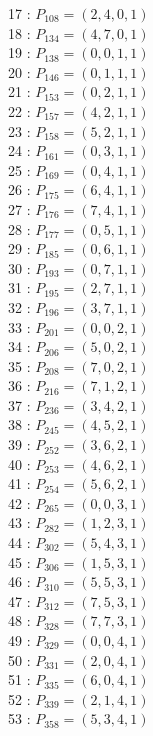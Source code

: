 \documentclass{article}
\begin{document}
{\begin{multicols}{3}
17 : $P_{108}=( 2, 4, 0, 1 )$\\
18 : $P_{134}=( 4, 7, 0, 1 )$\\
19 : $P_{138}=( 0, 0, 1, 1 )$\\
20 : $P_{146}=( 0, 1, 1, 1 )$\\
21 : $P_{153}=( 0, 2, 1, 1 )$\\
22 : $P_{157}=( 4, 2, 1, 1 )$\\
23 : $P_{158}=( 5, 2, 1, 1 )$\\
24 : $P_{161}=( 0, 3, 1, 1 )$\\
25 : $P_{169}=( 0, 4, 1, 1 )$\\
26 : $P_{175}=( 6, 4, 1, 1 )$\\
27 : $P_{176}=( 7, 4, 1, 1 )$\\
28 : $P_{177}=( 0, 5, 1, 1 )$\\
29 : $P_{185}=( 0, 6, 1, 1 )$\\
30 : $P_{193}=( 0, 7, 1, 1 )$\\
31 : $P_{195}=( 2, 7, 1, 1 )$\\
32 : $P_{196}=( 3, 7, 1, 1 )$\\
33 : $P_{201}=( 0, 0, 2, 1 )$\\
34 : $P_{206}=( 5, 0, 2, 1 )$\\
35 : $P_{208}=( 7, 0, 2, 1 )$\\
36 : $P_{216}=( 7, 1, 2, 1 )$\\
37 : $P_{236}=( 3, 4, 2, 1 )$\\
38 : $P_{245}=( 4, 5, 2, 1 )$\\
39 : $P_{252}=( 3, 6, 2, 1 )$\\
40 : $P_{253}=( 4, 6, 2, 1 )$\\
41 : $P_{254}=( 5, 6, 2, 1 )$\\
42 : $P_{265}=( 0, 0, 3, 1 )$\\
43 : $P_{282}=( 1, 2, 3, 1 )$\\
44 : $P_{302}=( 5, 4, 3, 1 )$\\
45 : $P_{306}=( 1, 5, 3, 1 )$\\
46 : $P_{310}=( 5, 5, 3, 1 )$\\
47 : $P_{312}=( 7, 5, 3, 1 )$\\
48 : $P_{328}=( 7, 7, 3, 1 )$\\
49 : $P_{329}=( 0, 0, 4, 1 )$\\
50 : $P_{331}=( 2, 0, 4, 1 )$\\
51 : $P_{335}=( 6, 0, 4, 1 )$\\
52 : $P_{339}=( 2, 1, 4, 1 )$\\
53 : $P_{358}=( 5, 3, 4, 1 )$\\

\end{multicols}}
\end{document}
